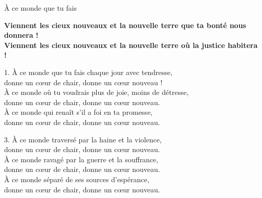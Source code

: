 À ce monde que tu fais

\textbf{Viennent les cieux nouveaux et la nouvelle terre que ta bonté nous donnera !\\
Viennent les cieux nouveaux et la nouvelle terre où la justice habitera !}

1. À ce monde que tu fais chaque jour avec tendresse,\\
donne un cœur de chair, donne un cœur nouveau !\\
À ce monde où tu voudrais plus de joie, moins de détresse,\\
donne un cœur de chair, donne un cœur nouveau.\\
À ce monde qui renaît s’il a foi en ta promesse,\\
donne un cœur de chair, donne un cœur nouveau.

3. À ce monde traversé par la haine et la violence,\\
donne un cœur de chair, donne un cœur nouveau.\\
À ce monde ravagé par la guerre et la souffrance, \\
donne un cœur de chair, donne un cœur nouveau.\\
À ce monde séparé de ses sources d’espérance, \\
donne un cœur de chair, donne un cœur nouveau.

